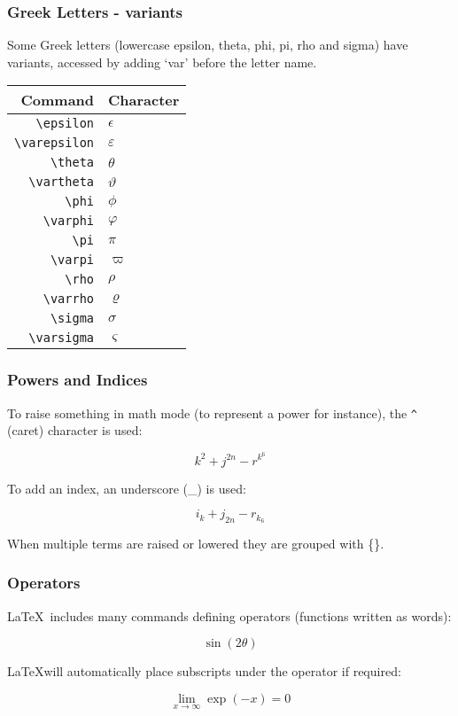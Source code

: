 \documentclass[mathserif]{beamer}
\begin{document}
\begin{frame}[fragile]
\frametitle{Greek Letters - variants}
\vfill
Some Greek letters (lowercase epsilon, theta, phi, pi, rho and sigma) have variants, accessed by adding `var' before the letter name.
\vfill
\begin{center}
\begin{tabular}{r | l}
	Command & Character \\
	\hline
	\texttt{{\textbackslash}epsilon} & $\epsilon$ \\
	\texttt{{\textbackslash}varepsilon} & $\varepsilon$ \\
	\texttt{{\textbackslash}theta} & $\theta$ \\
	\texttt{{\textbackslash}vartheta} & $\vartheta$ \\
	\texttt{{\textbackslash}phi} & $\phi$ \\
	\texttt{{\textbackslash}varphi} & $\varphi$ \\
	\texttt{{\textbackslash}pi} & $\pi$ \\
	\texttt{{\textbackslash}varpi} & $\varpi$ \\
	\texttt{{\textbackslash}rho} & $\rho$ \\
	\texttt{{\textbackslash}varrho} & $\varrho$ \\
	\texttt{{\textbackslash}sigma} & $\sigma$ \\
	\texttt{{\textbackslash}varsigma} & $\varsigma$ \\			
\end{tabular}
\end{center}
\vfill
\end{frame}

\begin{frame}[fragile]
\frametitle{Powers and Indices}
\vfill
To raise something in math mode (to represent a power for instance), the \texttt{\^} (caret) character is used:
\vfill
	\begin{LTXexample}[style=latexsty]
		\[ k^2 + j^{2n} - r^{k^6} \]
	\end{LTXexample}
\vfill
To add an index, an underscore (\_) is used:
\vfill
	\begin{LTXexample}[style=latexsty]
		\[ i_k + j_{2n} - r_{k_6} \]
	\end{LTXexample}
\vfill
When multiple terms are raised or lowered they are grouped with \{\}.
\vfill
\end{frame}


\begin{frame}[fragile]
\frametitle{Operators}
\vfill
\LaTeX\ includes many commands defining operators (functions written as words):
\vfill
	\begin{LTXexample}[style=latexsty]
		\[ \sin (2\theta) \]
	\end{LTXexample}
\vfill
\LaTeX will automatically place subscripts under the operator if required:
\vfill
	\begin{LTXexample}[style=latexsty]
		\[ \lim_{x \to \infty} \exp(-x) = 0 \]
	\end{LTXexample}
\vfill
\end{frame}
\end{document}
